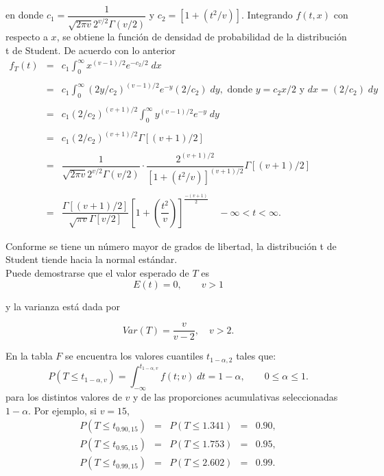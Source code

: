 \begin{teo}
	en donde $c_1=\dfrac{1}{\sqrt{2\pi v}2^{v/2}\Gamma(v/2)}$ y $c_2=\left[1+\left(t^2/v\right)\right]$. Integrando $f(t,x)$ con respecto a $x$, se obtiene la función de densidad de probabilidad de la distribución t de Student. De acuerdo con lo anterior
	$$
	\begin{array}{rcl}
	f_T(t)&=&c_1\displaystyle\int_0^\infty x^{(v-1)/2} e^{-c_2/2}\; dx\\\\
	&=& c_1 \displaystyle\int_0^\infty (2y/c_2)^{(v-1)/2}e^{-y}(2/c_2)\; dy, \mbox{ donde } y=c_2x/2 \mbox{ y } dx=(2/c_2)\; dy\\\\
	&=& c_1(2/c_2)^{(v+1)/2} \displaystyle\int_0^\infty y^{(v-1)/2}e^{-y}\; dy\\\\
	&=& c_1(2/c_2)^{(v+1)/2} \Gamma\left[(v+1)/2\right]\\\\
	&=& \dfrac{1}{\sqrt{2\pi v}2^{v/2}\Gamma(v/2)}\cdot \dfrac{2^{(v+1)/2}}{\left[1+(t^2/v)\right]^{(v+1)/2}}\Gamma\left[(v+1)/2\right]\\\\
	&=& \dfrac{\Gamma\left[(v+1)/2\right]}{\sqrt{\pi v}\Gamma\left[v/2\right]}\left[1+\left(\dfrac{t^2}{v}\right)\right]^{\frac{-(v+1)}{2}} \quad -\infty<t<\infty.
	\end{array}
	$$

\end{teo}

Conforme se tiene un número mayor de grados de libertad, la distribución t de Student tiende hacia la normal estándar. \\

Puede demostrarse que el valor esperado de $T$ es
$$E(t)=0,\qquad v>1$$

y la varianza está dada por

$$Var(T)=\dfrac{v}{v-2},\quad v>2.$$

En la tabla $F$ se encuentra los valores cuantiles $t_{1-\alpha,2}$ tales que:
$$P(T\leq t_{1-\alpha,v})=\int_{-\infty}^{t_{1-\alpha,v}}f(t;v)\; dt = 1-\alpha,\qquad 0\leq \alpha\leq 1.$$
para los distintos valores de $v$ y de las proporciones acumulativas seleccionadas $1-\alpha$. Por ejemplo, si $v=15$,
$$
\begin{array}{rclcl}
    P(T\leq t_{0.90,15})&=&P(T\leq 1.341)&=&0.90,\\
    P(T\leq t_{0.95,15})&=&P(T\leq 1.753)&=&0.95,\\
    P(T\leq t_{0.99,15})&=&P(T\leq 2.602)&=&0.99.
\end{array}
$$


